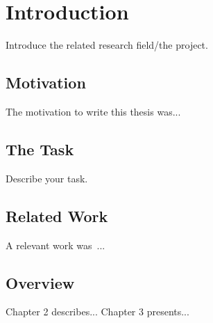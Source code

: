 

\chapter{\label{introduction}Introduction}
Introduce the related research field/the project.

\section{\label{introduction:motivation}Motivation}
The motivation to write this thesis was...

\section{\label{introduction:taskdescription}The Task}
Describe your task.

\section{\label{introduction:relatedwork}Related Work} 
A relevant work was~\cite{bib:relevantwork}... 

\section{\label{introduction:overview}Overview}
Chapter 2 describes... Chapter 3 presents... 